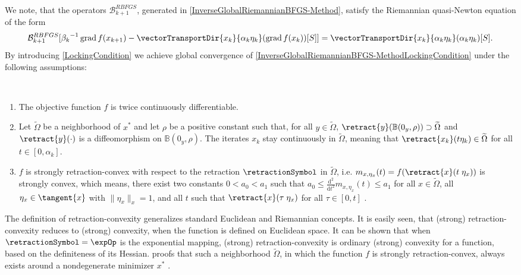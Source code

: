 We note, that the operators $\mathcal{B}^{RBFGS}_{k+1}$, generated in \cref{InverseGlobalRiemannianBFGS-Method}, satisfy the Riemannian quasi-Newton equation of the form
\begin{equation}\label{RiemannianQuasi-NewtonEquationLockinConditon}
    \mathcal{B}^{RBFGS}_{k+1}[{\beta_k}^{-1} \operatorname{grad} f(x_{k+1}) - \vectorTransportDir{x_k}{\alpha_k \eta_k}(\operatorname{grad} f(x_k))[S]] = \vectorTransportDir{x_k}{\alpha_k \eta_k}(\alpha_k \eta_k)[S].
\end{equation}
By introducing \cref{LockingCondition} we achieve global convergence of \cref{InverseGlobalRiemannianBFGS-MethodLockingCondition} under the following assumptions:

\begin{assumption}\label{RiemannianAssumptionsGlobalConvergenceLockingCondition} \ \\[-1.5\baselineskip]
    \begin{enumerate}
        \item The objective function $f$ is twice continuously differentiable.
        \item Let $\widetilde{\Omega}$ be a neighborhood of $x^*$ and let $\rho$ be a positive constant such that, for all $y \in \widetilde{\Omega}$, $\retract{y}(\mathbb{B}(0_y, \rho)) \supset \widetilde{\Omega}$ and $\retract{y}(\cdot)$ is a diffeomorphism on $\mathbb{B}(0_y, \rho)$. The iterates $x_k$ stay continuously in $\widetilde{\Omega}$, meaning that $\retract{x_k}(t \eta_k) \in \widetilde{\Omega}$ for all $t \in [0, \alpha_k]$. 
        \item $f$ is strongly retraction-convex with respect to the retraction $\retractionSymbol$ in $\widetilde{\Omega}$, i.e. $m_{x, \eta_x}(t) = f(\retract{x}(t \; \eta_x))$ is strongly convex, which means, there exist two constants $0 < a_0 < a_1$ such that $a_0 \leq \frac{\mathrm{d}^2}{\mathrm{d}t^2} m_{x, \eta_x}(t) \leq a_1$ for all $x \in \widetilde{\Omega}$, all $\eta_x \in \tangent{x}$ with $\lVert \eta_x \rVert_x = 1$, and all $t$ such that $\retract{x}(\tau \; \eta_x)$ for all $\tau \in [0,t]$ \cite[Definition~3.1.]{HuangGallivanAbsil:2015}.
    \end{enumerate}
\end{assumption}

The definition of retraction-convexity generalizes standard Euclidean and Riemannian concepts. It is easily seen, that (strong) retraction-convexity reduces to (strong) convexity, when the function is defined on Euclidean space. It can be shown that when $\retractionSymbol = \expOp$ is the exponential mapping, (strong) retraction-convexity is ordinary (strong) convexity for a function, based on the definiteness of its Hessian. \cite[Lemma~3.1]{HuangGallivanAbsil:2015} proofs that such a neighborhood $\widetilde{\Omega}$, in which the function $f$ is strongly retraction-convex, always exists around a nondegenerate minimizer $x^*$ \cite[p.~1665-1666]{HuangGallivanAbsil:2015}. \\

